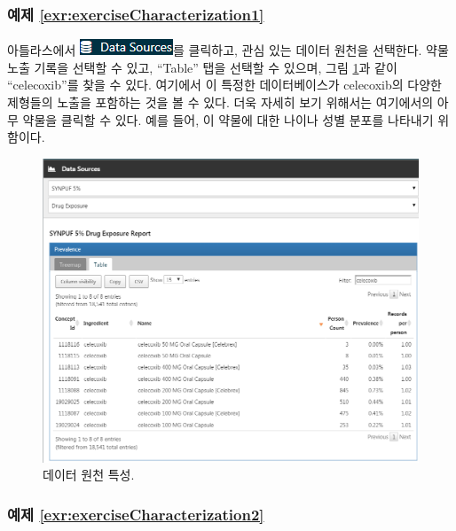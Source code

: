 \documentclass[10.5pt]{book}
\theoremstyle{definition}
\theoremstyle{definition}
\theoremstyle{definition}
\theoremstyle{remark}
\begin{document}
\subsubsection*{예제
\ref{exr:exerciseCharacterization1}}\label{-refexrexercisecharacterization1}

아틀라스에서
\includegraphics{images/Characterization/atlasDataSourcesMenuItem.png}를
클릭하고, 관심 있는 데이터 원천을 선택한다. 약물 노출 기록을 선택할 수
있고, ``Table'' 탭을 선택할 수 있으며, 그림 \ref{fig:dataSourcesAtlas}과
같이 ``celecoxib''를 찾을 수 있다. 여기에서 이 특정한 데이터베이스가
celecoxib의 다양한 제형들의 노출을 포함하는 것을 볼 수 있다. 더욱 자세히
보기 위해서는 여기에서의 아무 약물을 클릭할 수 있다. 예를 들어, 이
약물에 대한 나이나 성별 분포를 나타내기 위함이다.

\begin{figure}

{\centering \includegraphics[width=1\linewidth]{images/SuggestedAnswers/dataSourcesAtlas} 

}

\caption{데이터 원천 특성.}\label{fig:dataSourcesAtlas}
\end{figure}

\subsubsection*{예제
\ref{exr:exerciseCharacterization2}}\label{-refexrexercisecharacterization2}
\end{document}
